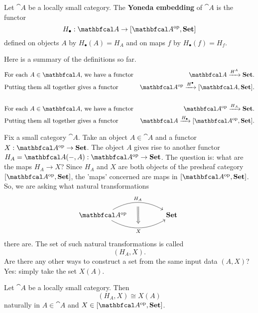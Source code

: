 \documentclass[11pt,a4paper]{article}
\begin{document}
\begin{definition}
    Let $\cat{A}$ be a locally small category. The \textbf{Yoneda embedding} of $\cat{A}$ is the functor
    \begin{equation*}
        H_{\bullet}:\cat{A}\to [\catop{A},\bcat{Set}]
    \end{equation*}
    defined on objects $A$ by $H_{\bullet}(A)=H_A$ and on maps $f$ by $H_{\bullet}(f)=H_f$.
\end{definition}

Here is a summary of the definitions so far.
\begin{align*}
    &\text{For each $A\in\cat{A}$, we have a functor} &\cat{A} \xrightarrow{H^A} \bcat{Set}.\\
    &\text{Putting them all together gives a functor} &\catop{A} \xrightarrow{H^{\bullet}} [\cat{A},\bcat{Set}].\\ \\
    &\text{For each $A\in\cat{A}$, we have a functor} &\catop{A} \xrightarrow{H_A} \bcat{Set}.\\
    &\text{Putting them all together gives a functor} &\cat{A} \xrightarrow{H_{\bullet}} [\catop{A},\bcat{Set}].
\end{align*}

Fix a small category $\cat{A}$. Take an object $A\in\cat{A}$ and a functor $X:\catop{A}\to\bcat{Set}$. The object $A$ gives rise to another functor $H_A=\cat{A}(-,A):\catop{A}\to\bcat{Set}$. The question is: what are the maps $H_A\to X$? Since $H_A$ and $X$ are both objects of the presheaf category $[\catop{A}, \bcat{Set}]$, the 'maps' concerned are maps in $[\catop{A},\bcat{Set}]$. So, we are asking what natural transformations
\begin{equation*}
\begin{tikzcd}
    \catop{A}
    \arrow[rr, bend left=30, "H_A"{name=t}]
    \arrow[rr, bend right=30, "X"'{name=b}]
    && \bcat{Set} \
    \arrow[from=t, Rightarrow, to=b, shorten <= 6pt, shorten >= 6pt]
\end{tikzcd}
\end{equation*}
there are. The set of such natural transformations is called
\begin{equation*}
    [\catop{A},\bcat{Set}](H_A,X).
\end{equation*}
Are there any other ways to construct a set from the same input data $(A,X)$? Yes: simply take the set $X(A)$.

\begin{theorem}[Yoneda]
    Let $\cat{A}$ be a locally small category. Then
    \begin{equation}
        [\catop{A},\bcat{Set}](H_A,X)\cong X(A)
    \end{equation}
    naturally in $A\in\cat{A}$ and $X\in [\catop{A},\bcat{Set}]$.
\end{theorem}
\end{document}
